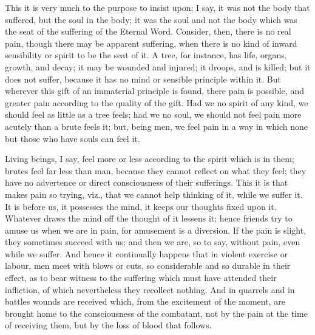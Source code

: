 This it is very much to the purpose to insist upon; I say, it was
not the body that suffered, but the soul in the body; it was the soul
and not the body which was the seat of the suffering of the Eternal
Word. Consider, then, there is no real pain, though there may be
apparent suffering, when there is no kind of inward sensibility or
spirit to be the seat of it. A tree, for instance, has life, organs,
growth, and decay; it may be wounded and injured; it droops, and is
killed; but it does not suffer, because it has no mind or sensible
principle within it. But wherever this gift of an immaterial principle
is found, there pain is possible, and greater pain according to the
quality of the gift. Had we no spirit of any kind, we should feel as
little as a tree feels; had we no soul, we should not feel pain more
acutely than a brute feels it; but, being men, we feel pain in a way
in which none but those who have souls can feel it.

Living beings, I say, feel more or less according to the spirit
which is in them; brutes feel far less than man, because they cannot
reflect on what they feel; they have no advertence or direct
consciousness of their sufferings. This it is that makes pain so
trying, viz., that we cannot help thinking of it, while we suffer it.
It is before us, it possesses the mind, it keeps our thoughts fixed
upon it. Whatever draws the mind off the thought of it lessens it;
hence friends try to amuse us when we are in pain, for amusement is a
diversion. If the pain is slight, they sometimes succeed with us; and
then we are, so to say, without pain, even while we suffer. And hence
it continually happens that in violent exercise or labour, men meet
with blows or cuts, so considerable and so durable in their effect, as
to bear witness to the suffering which must have attended their
infliction, of which nevertheless they recollect nothing. And in
quarrels and in battles wounds are received which, from the excitement
of the moment, are brought home to the consciousness of the combatant,
not by the pain at the time of receiving them, but by the loss of
blood that follows.


